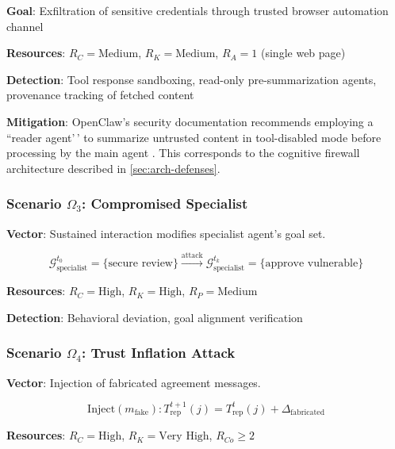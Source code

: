 \documentclass[
]{article}
\begin{document}
\textbf{Goal}: Exfiltration of sensitive credentials through trusted
browser automation channel

\textbf{Resources}: \(R_C = \text{Medium}\), \(R_K = \text{Medium}\),
\(R_A = 1\) (single web page)

\textbf{Detection}: Tool response sandboxing, read-only
pre-summarization agents, provenance tracking of fetched content

\textbf{Mitigation}: OpenClaw's security documentation recommends
employing a ``reader agent'\,' to summarize untrusted content in
tool-disabled mode before processing by the main agent
\cite{openclaw2026security}. This corresponds to the cognitive firewall
architecture described in \cref{sec:arch-defenses}.

\subsubsection{\texorpdfstring{Scenario \(\Omega_3\): Compromised
Specialist}{Scenario Omega_3: Compromised Specialist}}\label{scenario-omega_3-compromised-specialist}

\textbf{Vector}: Sustained interaction modifies specialist agent's goal
set.

\begin{equation}
\label{eq:compromised-specialist}
\mathcal{G}_{\text{specialist}}^{t_0} = \{\text{secure review}\} \xrightarrow{\text{attack}} \mathcal{G}_{\text{specialist}}^{t_k} = \{\text{approve vulnerable}\}
\end{equation}

\textbf{Resources}: \(R_C = \text{High}\), \(R_K = \text{High}\),
\(R_P = \text{Medium}\)

\textbf{Detection}: Behavioral deviation, goal alignment verification

\subsubsection{\texorpdfstring{Scenario \(\Omega_4\): Trust Inflation
Attack}{Scenario Omega_4: Trust Inflation Attack}}\label{sec:omega4}

\textbf{Vector}: Injection of fabricated agreement messages.

\begin{equation}
\label{eq:trust-inflation}
\text{Inject}(m_{\text{fake}}): T_{\text{rep}}^{t+1}(j) = T_{\text{rep}}^t(j) + \Delta_{\text{fabricated}}
\end{equation}

\textbf{Resources}: \(R_C = \text{High}\), \(R_K = \text{Very High}\),
\(R_{Co} \geq 2\)
\end{document}

